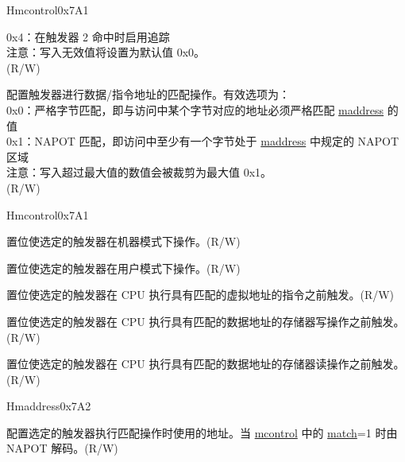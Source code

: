 \begin{register}{H}{mcontrol}{0x7A1}
\begin{regdesc}
\begin{reglist}
0x4：在触发器 2 命中时启用追踪\\
注意：写入无效值将设置为默认值 0x0。\\
(R/W)
\label{fielddesc:MCONTROLMATCH}\item [match] 配置触发器进行数据/指令地址的匹配操作。有效选项为：\\
0x0：严格字节匹配，即与访问中某个字节对应的地址必须严格匹配 \hyperref[regdesc:MADDRESS]{maddress} 的值\\
0x1：NAPOT 匹配，即访问中至少有一个字节处于  \hyperref[regdesc:MADDRESS]{maddress} 中规定的 NAPOT 区域\\
注意：写入超过最大值的数值会被裁剪为最大值 0x1。\\
(R/W)
\item [见下页……]
\end{reglist}\end{regdesc}
\end{register}
\addtocounter{Regfloat}{-1}
\begin{register}{H}{mcontrol}{0x7A1}
\begin{regdesc}\begin{reglist}
\item [接上页……]
\label{fielddesc:MCONTROLM}\item [m] 置位使选定的触发器在机器模式下操作。(R/W)
\label{fielddesc:MCONTROLU}\item [u] 置位使选定的触发器在用户模式下操作。(R/W)
\label{fielddesc:MCONTROLEXECUTE}\item [execute] 置位使选定的触发器在 CPU 执行具有匹配的虚拟地址的指令之前触发。(R/W)
\label{fielddesc:MCONTROLSTORE}\item [store] 置位使选定的触发器在 CPU 执行具有匹配的数据地址的存储器写操作之前触发。(R/W)
\label{fielddesc:MCONTROLLOAD}\item [load] 置位使选定的触发器在 CPU 执行具有匹配的数据地址的存储器读操作之前触发。(R/W)
\end{reglist}\end{regdesc}
\end{register}

\begin{register}{H}{maddress}{0x7A2}\label{regdesc:MADDRESS}
%
\regnewline%
\begin{regdesc}\begin{reglist}
\label{fielddesc:MADDRESS}\item [maddress] 配置选定的触发器执行匹配操作时使用的地址。当 \hyperref[regdesc:MCONTROL]{mcontrol} 中的 \hyperref[fielddesc:MCONTROLMATCH]{match}=1 时由 NAPOT 解码。(R/W)
\end{reglist}\end{regdesc}
\end{register}
